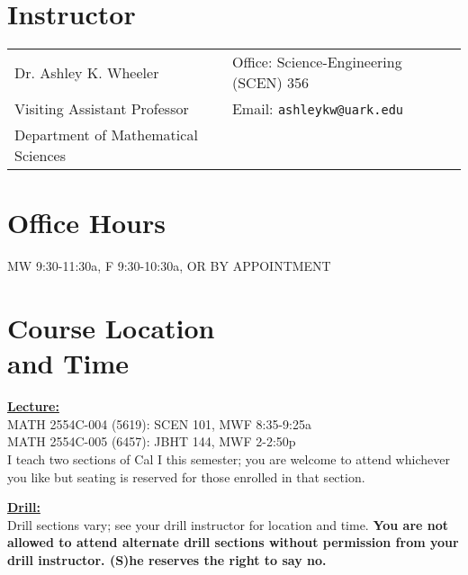 \documentclass[margin,line,pifont,palatino,courier]{res}
\begin{document}

\begin{resume}

\section{\sc Instructor}

\vspace{.05in}
\begin{tabular}{@{}p{2.6in}p{4in}}
Dr. Ashley K. Wheeler & Office: Science-Engineering (SCEN) 356 \\
Visiting Assistant Professor & Email: \verb+ashleykw@uark.edu+ \\
Department of Mathematical Sciences & 
\end{tabular}

\section{\sc Office Hours}
MW 9:30-11:30a, F 9:30-10:30a, OR BY APPOINTMENT

\section{\sc Course Location \\ and Time} \textbf{\underline{Lecture:}} \\
MATH 2554C-004 (5619): SCEN 101, MWF 8:35-9:25a \\
MATH 2554C-005 (6457): JBHT 144, MWF 2-2:50p \\
I teach two sections of Cal I this semester; you are welcome to attend whichever you like but seating is reserved for those enrolled in that section.

\textbf{\underline{Drill:}}  \\
Drill sections vary; see your drill instructor for location and time.  {\bf You are not allowed to attend alternate drill sections without permission from your drill instructor.  (S)he reserves the right to say no.}


\end{resume}
\end{document}
